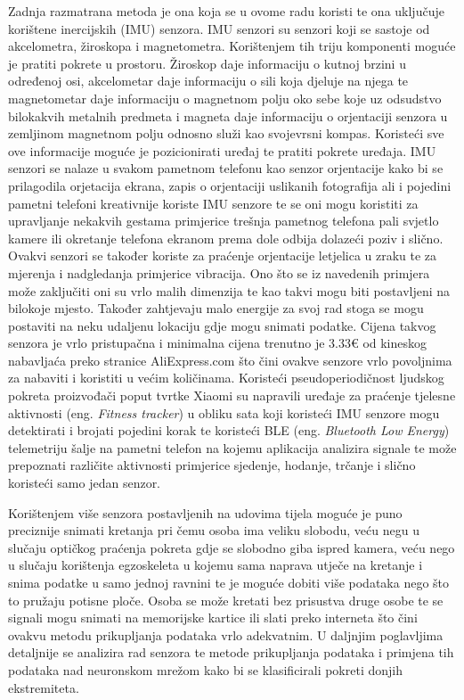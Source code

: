 \documentclass[times, utf8, diplomski]{fer}
\begin{document}
Zadnja razmatrana metoda je ona koja se u ovome radu koristi te ona uključuje korištene inercijskih (IMU) senzora. IMU senzori su
senzori koji se sastoje od akcelometra, žiroskopa i magnetometra. Korištenjem tih triju komponenti moguće je pratiti pokrete u
prostoru. Žiroskop daje informaciju o kutnoj brzini u određenoj osi, akcelometar daje informaciju o sili koja djeluje na njega
te magnetometar daje informaciju o magnetnom polju oko sebe koje uz odsudstvo bilokakvih metalnih predmeta i magneta daje informaciju
o orjentaciji senzora u zemljinom magnetnom polju odnosno služi kao svojevrsni kompas. Koristeći sve ove informacije moguće je
pozicionirati uređaj te pratiti pokrete uređaja. IMU senzori se nalaze u svakom pametnom telefonu kao senzor orjentacije kako bi se
prilagodila orjetacija ekrana, zapis o orjentaciji uslikanih fotografija ali i pojedini pametni telefoni kreativnije koriste IMU
senzore te se oni mogu koristiti za upravljanje nekakvih gestama primjerice trešnja pametnog telefona pali svjetlo kamere ili
okretanje telefona ekranom prema dole odbija dolazeći poziv i slično. Ovakvi senzori se također koriste za praćenje orjentacije
letjelica u zraku te za mjerenja i nadgledanja primjerice vibracija. Ono što se iz navedenih primjera može zaključiti oni su vrlo
malih dimenzija te kao takvi mogu biti postavljeni na bilokoje mjesto. Također zahtjevaju malo energije za svoj rad stoga se mogu
postaviti na neku udaljenu lokaciju gdje mogu snimati podatke. Cijena takvog senzora je vrlo pristupačna i minimalna cijena trenutno
je 3.33€ od kineskog nabavljaća preko stranice AliExpress.com što čini ovakve senzore vrlo povoljnima za nabaviti i koristiti u
većim količinama. Koristeći pseudoperiodičnost ljudskog pokreta proizvođači poput tvrtke Xiaomi su napravili uređaje za praćenje
tjelesne aktivnosti (eng. \textit{Fitness tracker}) u obliku sata koji koristeći IMU senzore mogu detektirati i brojati pojedini korak 
te koristeći BLE (eng. \textit{Bluetooth Low Energy}) telemetriju šalje na pametni telefon na kojemu aplikacija analizira signale
te može prepoznati različite aktivnosti primjerice sjedenje, hodanje, trčanje i slično koristeći samo jedan senzor.

Korištenjem više senzora postavljenih na udovima tijela moguće je puno preciznije snimati kretanja pri čemu osoba ima veliku slobodu,
veću negu u slučaju optičkog praćenja pokreta gdje se slobodno giba ispred kamera, veću nego u slučaju korištenja egzoskeleta u
kojemu sama naprava utječe na kretanje i snima podatke u samo jednoj ravnini te je moguće dobiti više podataka nego što to pružaju
potisne ploče. Osoba se može kretati bez prisustva druge osobe te se signali mogu snimati na memorijske kartice ili slati preko
interneta što čini ovakvu metodu prikupljanja podataka vrlo adekvatnim. U daljnjim poglavljima detaljnije se analizira
rad senzora te metode prikupljanja podataka i primjena tih podataka nad neuronskom mrežom kako bi se klasificirali pokreti donjih
ekstremiteta.
\end{document}
